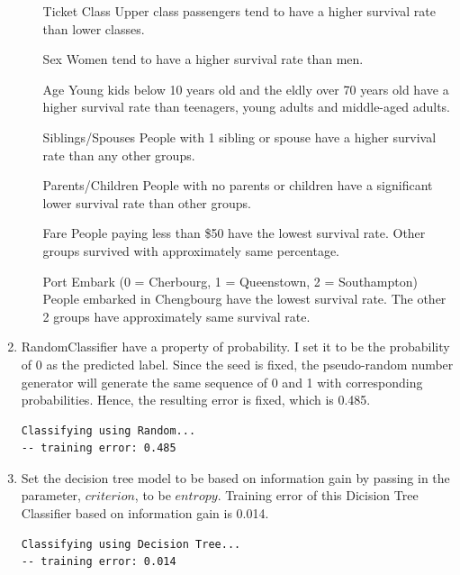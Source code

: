 \documentclass[11pt]{article}
\begin{document}
\begin{enumerate}[label=(\alph*)]
    \begin{enumerate}
        \item[Ticket Class] Upper class passengers tend to have a higher survival rate than lower classes.
        \item[Sex] Women tend to have a higher survival rate than men.
        \item[Age] Young kids below 10 years old and the eldly over 70 years old have a higher survival rate than teenagers, young adults and middle-aged adults.
        \item[Siblings/Spouses] People with 1 sibling or spouse have a higher survival rate than any other groups.
        \item[Parents/Children] People with no parents or children have a significant lower survival rate than other groups.
        \item[Fare] People paying less than \$50 have the lowest survival rate. Other groups survived with approximately same percentage.
        \item[Port Embark] (0 = Cherbourg, 1 = Queenstown, 2 = Southampton) People embarked in Chengbourg have the lowest survival rate. The other 2 groups have approximately same survival rate.
    \end{enumerate}

    \item
    RandomClassifier have a property of probability. I set it to be the probability of 0 as the predicted label. Since the seed is fixed, the pseudo-random number generator will generate the same sequence of 0 and 1 with corresponding probabilities. Hence, the resulting error is fixed, which is 0.485.
    \begin{verbatim}
Classifying using Random...
-- training error: 0.485
    \end{verbatim}

    \item
    Set the decision tree model to be based on information gain by passing in the parameter, $criterion$, to be $entropy$. Training error of this Dicision Tree Classifier based on information gain is 0.014.
    \begin{verbatim}
Classifying using Decision Tree...
-- training error: 0.014
    \end{verbatim} 


\end{enumerate}
\end{document}
